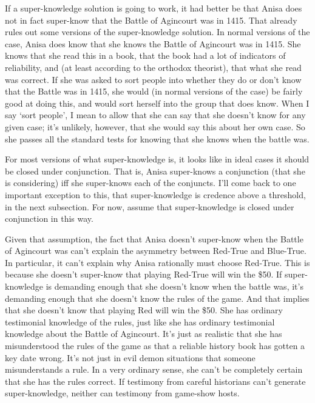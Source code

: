 \documentclass[
  12pt,
  letterpaper,
]{scrbook}
\begin{document}
If a super-knowledge solution is going to work, it had better be that
Anisa does not in fact super-know that the Battle of Agincourt was in
1415. That already rules out some versions of the super-knowledge
solution. In normal versions of the case, Anisa does know that she knows
the Battle of Agincourt was in 1415. She knows that she read this in a
book, that the book had a lot of indicators of reliability, and (at
least according to the orthodox theorist), that what she read was
correct. If she was asked to sort people into whether they do or don't
know that the Battle was in 1415, she would (in normal versions of the
case) be fairly good at doing this, and would sort herself into the
group that does know. When I say `sort people', I mean to allow that she
can say that she doesn't know for any given case; it's unlikely,
however, that she would say this about her own case. So she passes all
the standard tests for knowing that she knows when the battle was.

For most versions of what super-knowledge is, it looks like in ideal
cases it should be closed under conjunction. That is, Anisa super-knows
a conjunction (that she is considering) iff she super-knows each of the
conjuncts. I'll come back to one important exception to this, that
super-knowledge is credence above a threshold, in the next subsection.
For now, assume that super-knowledge is closed under conjunction in this
way.

Given that assumption, the fact that Anisa doesn't super-know when the
Battle of Agincourt was can't explain the asymmetry between Red-True and
Blue-True. In particular, it can't explain why Anisa rationally must
choose Red-True. This is because she doesn't super-know that playing
Red-True will win the \$50. If super-knowledge is demanding enough that
she doesn't know when the battle was, it's demanding enough that she
doesn't know the rules of the game. And that implies that she doesn't
know that playing Red will win the \$50. She has ordinary testimonial
knowledge of the rules, just like she has ordinary testimonial knowledge
about the Battle of Agincourt. It's just as realistic that she has
misunderstood the rules of the game as that a reliable history book has
gotten a key date wrong. It's not just in evil demon situations that
someone misunderstands a rule. In a very ordinary sense, she can't be
completely certain that she has the rules correct. If testimony from
careful historians can't generate super-knowledge, neither can testimony
from game-show hosts.
\end{document}
